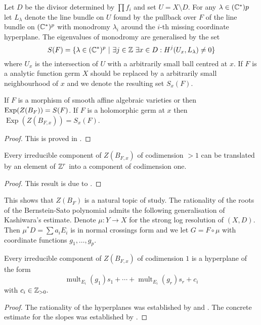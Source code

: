 Let $D$ be the divisor determined by $\prod f_i$ and set $U= X\setminus D$.
For any $\lambda \in (\mathbb{C}^*)p$ let $L_\lambda$ denote the line bundle on $U$ found by the pullback over $F$ of the line bundle on $(\mathbb{C}^*)^p$ with monodromy $\lambda_i$ around the $i$-th missing coordinate hyperplane.
The eigenvalues of monodromy are generalised by the set
$$S(F) = \{\lambda \in (\mathbb{C}^*)^p \ \vert\  \exists j\in \mathbb{Z}\  \exists x\in D: H^j(U_x,L_\lambda) \neq 0\} $$
where $U_x$ is the intersection of $U$ with a arbitrarily small ball centred at $x$.
If $F$ is a analytic function germ $X$ should be replaced by a arbitrarily small neighbourhood of $x$ and we denote the resulting set $S_x(F)$.
\begin{theorem}
  If $F$ is a morphism of smooth affine algebraic varieties or then $\operatorname{Exp}(Z(B_F)) = S(F)$. If $F$ is a holomorphic germ at $x$ then $\operatorname{Exp}(Z(B_{F,x})) = S_x(F)$.
\end{theorem}
\begin{proof}
  This is proved in \cite{budur2019zero}.
\end{proof}
\begin{theorem}
  Every irreducible component of $Z(B_{F,x})$ of codimension $>1$ can be translated by an element of $\mathbb{Z}^r$ into a component of codimension one.
\end{theorem}
\begin{proof}
  This result is due to \cite{maisonobe2016filtration}.
\end{proof}
This shows that $Z(B_{F})$ is a natural topic of study.
The rationality of the roots of the Bernstein-Sato polynomial admits the following generalisation of Kashiwara's estimate.
Denote $\mu:Y\to X$ for the strong log resolution of $(X,D)$.
Then $\mu^*D = \sum a_i E_i$ is in normal crossings form and we let $G = F\circ \mu$ with coordinate functions $g_1,\ldots, g_p$.
\begin{theorem}
  Every irreducible component of $Z(B_{F,x})$ of codimension $1$ is a hyperplane of the form
  $$\operatorname{mult}_{E_i}(g_1) s_1 + \cdots + \operatorname{mult}_{E_i}(g_r)s_r + c_i $$
  with $c_i\in \mathbb{Z}_{>0}.$
\end{theorem}
\begin{proof}
  The rationality of the hyperplanes was established by \cite{sabbah1987proximite} and \cite{gyoja1993bernstein}.
  The concrete estimate for the slopes was established by \cite{budur2019zero}.
\end{proof}

